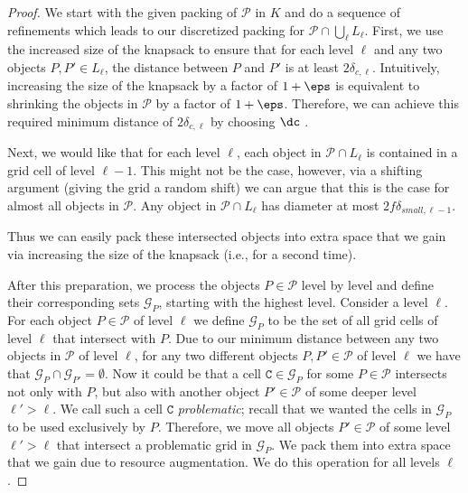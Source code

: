 \begin{proof}
	We start with the given packing of $\mathcal{P}$ in $K$ and do a
	sequence of refinements which leads to our discretized packing for
	$\mathcal{P}\cap\bigcup_{\ell}L_{\ell}$. First, we use the increased
	size of the knapsack to ensure that for each level $\ell$ and any
	two objects $P,P'\in L_{\ell}$, the distance between $P$ and $P'$
	is at least $2\delta_{c,\ell}$. Intuitively, increasing the size
	of the knapsack by a factor of $1+\eps$ is equivalent to shrinking
	the objects in $\mathcal{P}$ by a factor of $1+\eps$. Therefore,
	we can achieve this required minimum distance of $2\delta_{c,\ell}$
	by choosing $\dc$ .
	
	
	Next, we would like that for each level $\ell$, each object in $\mathcal{P}\cap L_{\ell}$
	is contained in a grid cell of level $\ell-1$. This might not be
	the case, however, via a shifting argument (giving the grid a random
	shift) we can argue that this is the case for almost all objects in
	$\mathcal{P}$.
 Any object in $\mathcal{P}\cap L_{\ell}$ has diameter at most $2f \delta_{small,\ell-1}$. 
 
	Thus we can easily pack these intersected objects into extra
	space that we gain via increasing the size of the knapsack (i.e.,
	for a second time).
	
	After this preparation, we process the objects $P\in\mathcal{P}$
	level by level and define their corresponding sets $\mathcal{G}_{P}$,
	starting with the highest level. Consider a level $\ell$. For each
	object $P\in\mathcal{P}$ of level $\ell$ we define $\mathcal{G}_{P}$
	to be the set of all grid cells of level $\ell$ that intersect with
	$P$. Due to our minimum distance between any two objects in $\mathcal{P}$
	of level $\ell$, for any two different objects $P,P'\in\mathcal{P}$
	of level $\ell$ we have that $\mathcal{G}_{P}\cap\mathcal{G}_{P'}=\emptyset$.
	Now it could be that a cell $\texttt{C} \in\mathcal{G}_{P}$ for some $P\in\mathcal{P}$
	intersects not only with $P$, but also with another object $P'\in\mathcal{P}$
	of some deeper level $\ell'>\ell$. We call such a cell $\texttt{C}$ \emph{problematic};
	recall that we wanted the cells in $\mathcal{G}_{P}$ to be used exclusively
	by $P$. Therefore, we move all objects $P'\in\mathcal{P}$ of some
	level $\ell'>\ell$ that intersect a problematic grid  in $\mathcal{G}_{P}$.
	We pack them into extra space that we gain due to resource augmentation.
	We do this operation for all levels $\ell$.
	

\end{proof}
